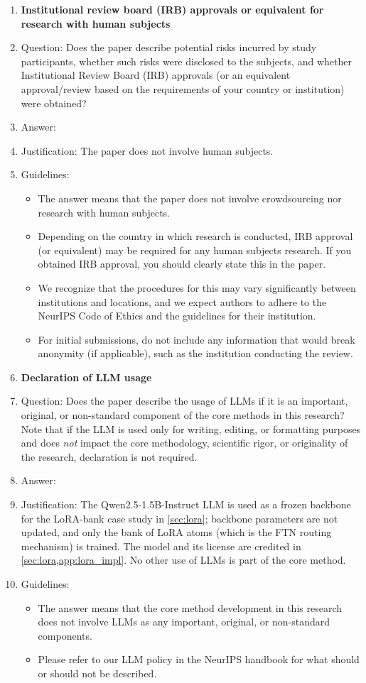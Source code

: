 \begin{enumerate}
\item {\bf Institutional review board (IRB) approvals or equivalent for research with human subjects}
    \item[] Question: Does the paper describe potential risks incurred by study participants, whether such risks were disclosed to the subjects, and whether Institutional Review Board (IRB) approvals (or an equivalent approval/review based on the requirements of your country or institution) were obtained?
    \item[] Answer: \answerNA{}
    \item[] Justification: The paper does not involve human subjects.
    \item[] Guidelines:
    \begin{itemize}
        \item The answer \answerNA{} means that the paper does not involve crowdsourcing nor research with human subjects.
        \item Depending on the country in which research is conducted, IRB approval (or equivalent) may be required for any human subjects research. If you obtained IRB approval, you should clearly state this in the paper.
        \item We recognize that the procedures for this may vary significantly between institutions and locations, and we expect authors to adhere to the NeurIPS Code of Ethics and the guidelines for their institution.
        \item For initial submissions, do not include any information that would break anonymity (if applicable), such as the institution conducting the review.
    \end{itemize}

\item {\bf Declaration of LLM usage}
    \item[] Question: Does the paper describe the usage of LLMs if it is an important, original, or non-standard component of the core methods in this research? Note that if the LLM is used only for writing, editing, or formatting purposes and does \emph{not} impact the core methodology, scientific rigor, or originality of the research, declaration is not required.
    \item[] Answer: \answerYes{}
    \item[] Justification: The Qwen2.5-1.5B-Instruct LLM is used as a frozen backbone for the LoRA-bank case study in \cref{sec:lora}; backbone parameters are not updated, and only the bank of LoRA atoms (which is the FTN routing mechanism) is trained. The model and its license are credited in \cref{sec:lora,app:lora_impl}. No other use of LLMs is part of the core method.
    \item[] Guidelines:
    \begin{itemize}
        \item The answer \answerNA{} means that the core method development in this research does not involve LLMs as any important, original, or non-standard components.
        \item Please refer to our LLM policy in the NeurIPS handbook for what should or should not be described.
    \end{itemize}

\end{enumerate}
